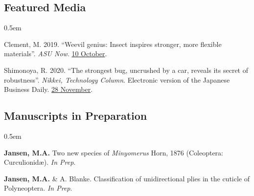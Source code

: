 \documentclass[12pt,a4paper]{article}
\begin{document}
	\subsection*{Featured Media}
	\begin{description}
		\itemsep0.5em
		\item Clement, M. 2019. ``Weevil genius: Insect inspires stronger, more flexible materials''. \textit{ASU Now}. \href{https://asunow.asu.edu/20191010-discoveries-asu-engineering-weevil-inspires-stronger-flexible-materials}{10 October}.
		\item Shimonoya, R. 2020. ``The strongest bug, uncrushed by a car, reveals its secret of robustness''. \textit{Nikkei, Technology Column}. Electronic version of the Japanese Business Daily. \href{https://www.nikkei.com/article/DGXMZO66746060X21C20A1MY1000/}{28 November}.
	\end{description}

	\subsection*{Manuscripts in Preparation}
		\begin{description}
			\itemsep0.5em
			\item \textbf{Jansen, M.A.} Two new species of \textit{Minyomerus} Horn, 1876 (Coleoptera: Curculionid\ae). \textit{In Prep}.
			\item \textbf{Jansen, M.A.} \& A. Blanke. Classification of unidirectional plies in the cuticle of Polyneoptera. \textit{In Prep}.
		\end{description}
\end{document}
